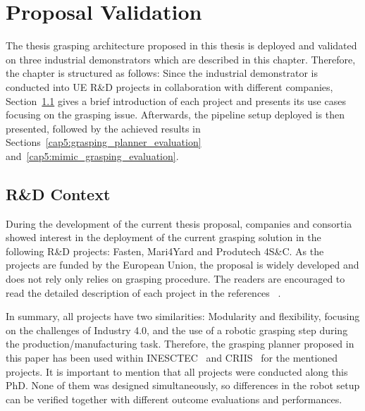 \chapter{Proposal Validation}
\label{cap5:results}

The thesis grasping architecture proposed in this thesis is deployed and validated on three industrial demonstrators which are described in this chapter. Therefore, the chapter is structured as follows: Since the industrial demonstrator is conducted into UE R\&D projects in collaboration with different companies, Section~\ref{cap5:red_context} gives a brief introduction of each project and presents its use cases focusing on the grasping issue. Afterwards, the pipeline setup deployed is then presented, followed by the achieved results in Sections~\ref{cap5:grasping_planner_evaluation} and~\ref{cap5:mimic_grasping_evaluation}.


\section{R\&D Context}
\label{cap5:red_context}

During the development of the current thesis proposal, companies and consortia showed interest in the deployment of the current grasping solution in the following R\&D projects: Fasten, Mari4Yard and Produtech 4S\&C. As the projects are funded by the European Union, the proposal is widely developed and does not rely only relies on grasping procedure. The readers are encouraged to read the detailed description of each project in the references ~\cite{fasten,mari4yard,produtech4sc}.

In summary, all projects have two similarities: Modularity and flexibility, focusing on the challenges of Industry 4.0, and the use of a robotic grasping step during the production/manufacturing task. Therefore, the grasping planner proposed in this paper has been used within INESCTEC~\cite{inesctec} and CRIIS~\cite{criis} for the mentioned projects. 
It is important to mention that all projects were conducted along this PhD. None of them was designed simultaneously, so differences in the robot setup can be verified together with different outcome evaluations and performances.

